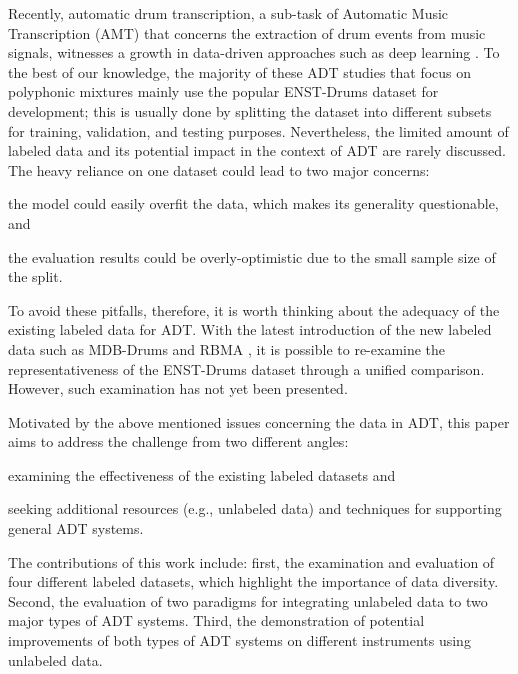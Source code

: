 \documentclass{article}
\begin{document}
Recently, automatic drum transcription, a sub-task of Automatic Music Transcription (AMT) \cite{Benetos2013} that concerns the extraction of drum events from music signals, witnesses a growth in data-driven approaches such as deep learning \cite{Vogl2016, Southall2016, Vogl2017_icassp, Southall2017, Vogl2017_ismir}. To the best of our knowledge, the majority of these ADT studies that focus on polyphonic mixtures mainly use the popular ENST-Drums dataset \cite{Gillet2006_enst} for development; this is usually done by splitting the dataset into different subsets for training, validation, and testing purposes. Nevertheless, the limited amount of labeled data and its potential impact in the context of ADT are rarely discussed. 
The heavy reliance on one dataset could lead to two major concerns: 
\begin{inparaenum}[(i)]
	\item   the model could easily overfit the data, which makes its generality questionable, and
    \item   the evaluation results could be overly-optimistic due to the small sample size of the split. 
\end{inparaenum} 
To avoid these pitfalls, therefore, it is worth thinking about the adequacy of the existing labeled data for ADT.
With the latest introduction of the new labeled data such as MDB-Drums \cite{Southall2017_mdb} and RBMA \cite{Vogl2017_ismir}, it is possible to re-examine the representativeness of the ENST-Drums dataset through a unified comparison. However, such examination has not yet been presented.

Motivated by the above mentioned issues concerning the data in ADT, this paper aims to address the challenge from two different angles:
\begin{inparaenum}[(i)]
	\item examining the effectiveness of the existing labeled datasets and
	\item seeking additional resources (e.g., unlabeled data) and techniques for supporting general ADT systems.
\end{inparaenum} 
The contributions of this work include: first, the examination and evaluation of four different labeled datasets, which highlight the importance of data diversity. Second, the evaluation of two paradigms for integrating unlabeled data to two major types of ADT systems. Third, the demonstration of potential improvements of both types of ADT systems on different instruments using unlabeled data.
\end{document}
